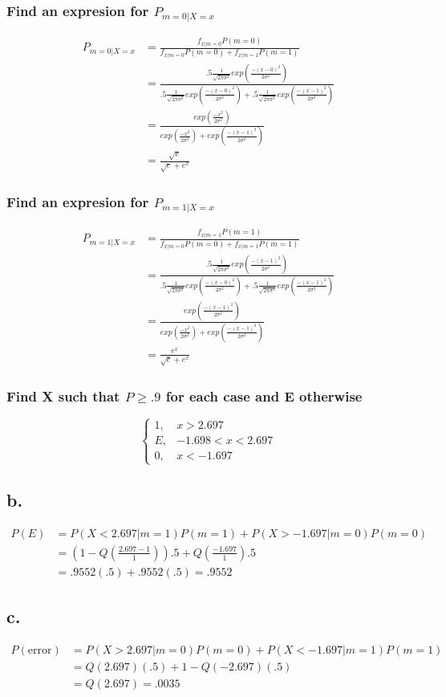 \documentclass[12pt]{article}
\newcommand{\normD}[3]{\frac{1}{\sqrt{2\pi #1^2}}exp(\frac{-( #2 - #3)^2}{2 #1^2})}
\begin{document}
\subsubsection*{Find an expresion for $P_{m=0|X=x}$}
\begin{align*}
  P_{m=0|X=x} &= \frac{f_{x|m=0}P(m=0)}{f_{x|m=0}P(m=0)+f_{x|m=1}P(m=1)} \\
  &= \frac{.5\normD{\sigma}{x}{0}}{.5\normD{\sigma}{x}{0}+.5\normD{\sigma}{x}{1}} \\
  &= \frac{exp(\frac{-x^2}{2\sigma^2})}
    {exp(\frac{-x^2}{2\sigma^2})+exp(\frac{-(x-1)^2}{2\sigma^2})} \\
  &= \frac{\sqrt{e}}{\sqrt{e}+e^x} 
\end{align*}
\subsubsection*{Find an expresion for $P_{m=1|X=x}$}
\begin{align*}
  P_{m=1|X=x} &= \frac{f_{x|m=1}P(m=1)}{f_{x|m=0}P(m=0)+f_{x|m=1}P(m=1)} \\
  &= \frac{.5\normD{\sigma}{x}{1}}{.5\normD{\sigma}{x}{0}+.5\normD{\sigma}{x}{1}} \\
  &= \frac{exp(\frac{-(x-1)^2}{2\sigma^2})}
    {exp(\frac{-x^2}{2\sigma^2})+exp(\frac{-(x-1)^2}{2\sigma^2})} \\
  &= \frac{e^x}{\sqrt{e}+e^x} 
\end{align*}
\subsubsection*{Find X such that $P \geq .9$ for each case and E otherwise}
\[
\begin{cases}
  1, & x > 2.697 \\
  E, & -1.698 < x < 2.697 \\
  0, & x < -1.697 
\end{cases}
\]
\subsection*{b.}
\begin{align*}
  P(E) &= P(X<2.697|m=1)P(m=1)+P(X>-1.697|m=0)P(m=0) \\
  &= (1 - Q(\frac{2.697-1}{1})).5 + Q(\frac{-1.697}{1}).5 \\
  &= .9552(.5) + .9552(.5) = .9552
\end{align*}
\subsection*{c.}
\begin{align*}
  P(\textrm{error}) &= P(X>2.697|m=0)P(m=0)+P(X<-1.697|m=1)P(m=1) \\
  &= Q(2.697)(.5) + 1 - Q(-2.697)(.5) \\
  &= Q(2.697) = .0035
\end{align*}
\end{document}
